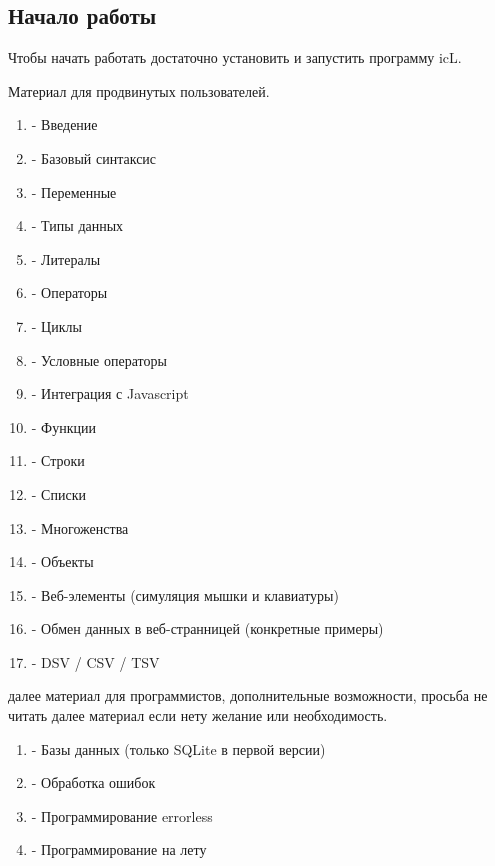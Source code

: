 \documentclass[a4paper, 14pt]{extarticle}
\begin{document}
	\subsection{Начало работы}
	
	Чтобы начать работать достаточно установить и запустить программу icL.
	
	\newpage
	{\color{red}Материал для продвинутых пользователей.}
  	
  	\begin{enumerate}
  	\item - Введение
  	\item - Базовый синтаксис
  	\item - Переменные
  	\item - Типы данных
  	\item - Литералы
  	\item - Операторы
  	\item - Циклы
  	\item - Условные операторы
  	\item - Интеграция с Javascript
  	\item - Функции
  	\item - Строки
  	\item - Списки
  	\item - Многоженства
  	\item - Объекты
  	\item - Веб-элементы (симуляция мышки и клавиатуры)
  	\item - Обмен данных в веб-странницей (конкретные примеры)
  	\item - DSV / CSV / TSV
  	\end{enumerate}
  	
  	{\color{red}далее материал для программистов, дополнительные возможности, просьба не читать далее материал если нету желание или необходимость.}
	
	\begin{enumerate}[resume]
  	\item - Базы данных (только SQLite в первой версии)
  	\item - Обработка ошибок
  	\item - Программирование errorless
  	\item - Программирование на лету
  	\end{enumerate}
	
\end{document}
